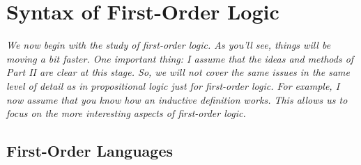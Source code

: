 \chapter{Syntax of First-Order Logic}

\emph{We now begin with the study of first-order logic. As you'll see, things will be moving a bit faster. One important thing: I assume that the ideas and methods of Part II are clear at this stage. So, we will not cover the same issues in the same level of detail as in propositional logic just for first-order logic. For example, I now assume that you know how an inductive definition works. This allows us to focus on the more interesting aspects of first-order logic.} 

\section{First-Order Languages}

